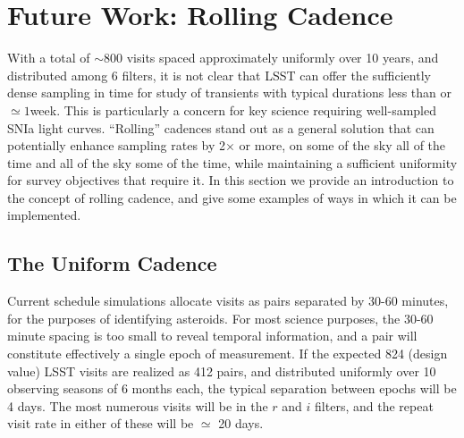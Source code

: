 %
%
%

\section{Future Work: Rolling Cadence}
\def\secname{rolling}\label{sec:\secname}


With a total of $\sim 800$ visits spaced approximately uniformly over 10
years, and distributed among 6 filters, it is not clear that LSST can
offer the sufficiently dense sampling in time for study of transients
with typical durations less than or $\simeq 1$week. This is particularly
a concern for key science requiring well-sampled SNIa light curves.
``Rolling'' cadences stand out as a general solution that can
potentially enhance sampling rates by 2$\times$ or more, on some of the
sky all of the time and all of the sky some of the time, while
maintaining a sufficient uniformity for survey objectives that require
it. In this section we provide an introduction to the concept of rolling
cadence, and give some examples of ways in which it can be implemented.


\subsection{The Uniform Cadence}

Current schedule simulations allocate visits as pairs separated by 30-60
minutes, for the purposes of identifying asteroids.  For most science
purposes, the 30-60 minute spacing is too small to reveal temporal
information, and a pair will constitute effectively a single epoch of
measurement.  If the expected 824 (design value) LSST visits are
realized as 412 pairs, and distributed uniformly over 10 observing
seasons of 6 months each, the typical separation between epochs will be
4 days.   The most numerous visits will be in the $r$ and $i$
filters, and the repeat visit rate in either of these will be $\simeq$
20 days.

